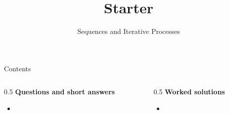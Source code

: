 \documentclass{beamer}
\title{Starter}
\subtitle{Sequences and Iterative Processes}
\begin{document}
\frame{\titlepage}

\begin{frame}{Contents}
\small
\begin{columns}[T]
\begin{column}{0.5\textwidth}
\textbf{Questions and short answers}
\begin{itemize}
\item \hyperlink{q-st1}{}
\end{itemize}
\end{column}
\begin{column}{0.5\textwidth}
\textbf{Worked solutions}
\begin{itemize}
\item \hyperlink{work-st1}{}
\end{itemize}
\end{column}
\end{columns}
\end{frame}
\end{document}
